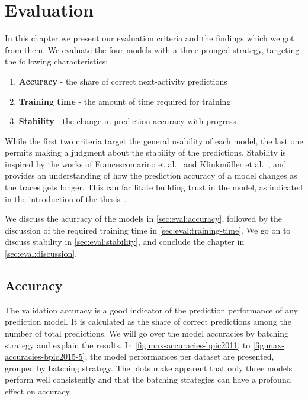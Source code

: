 \chapter{Evaluation}\label{chap:evaluation}
In this chapter we present our evaluation criteria and the findings which we got from them.
We evaluate the four models with a three-pronged strategy, targeting the following characteristics:

\begin{enumerate}
    \item\textbf{Accuracy} - the share of correct next-activity predictions
    \item\textbf{Training time} - the amount of time required for training
    \item\textbf{Stability} - the change in prediction accuracy with progress
\end{enumerate}

While the first two criteria target the general usability of each model, the last one permits making a judgment about the stability of the predictions. Stability is inspired by the works of Francescomarino et al.~\cite{francescomarino2015} and Klinkmüller et al.~\cite{klinkmuller2018reliablemonitoring}, and provides an understanding of how the prediction accuracy of a model changes as the traces gets longer. This can facilitate building trust in the model, as indicated in the introduction of the thesis~\cite{klinkmuller2018reliablemonitoring, boehmer2018probability}.

We discuss the acurracy of the models in \autoref{sec:eval:accuracy}, followed by the discussion of the required training time in \autoref{sec:eval:training-time}. We go on to discuss stability in \autoref{sec:eval:stability}, and conclude the chapter in \autoref{sec:eval:discussion}.

\section{Accuracy}\label{sec:eval:accuracy}
The validation accuracy is a good indicator of the prediction performance of any prediction model. It is calculated as the share of correct predictions among the number of total predictions. We will go over the model accuracies by batching strategy and explain the results. In \autoref{fig:max-accuracies-bpic2011} to \autoref{fig:max-accuracies-bpic2015-5}, the model performances per dataset are presented, grouped by batching strategy. The plots make apparent that only three models perform well consistently and that the batching strategies can have a profound effect on accuracy.\\

